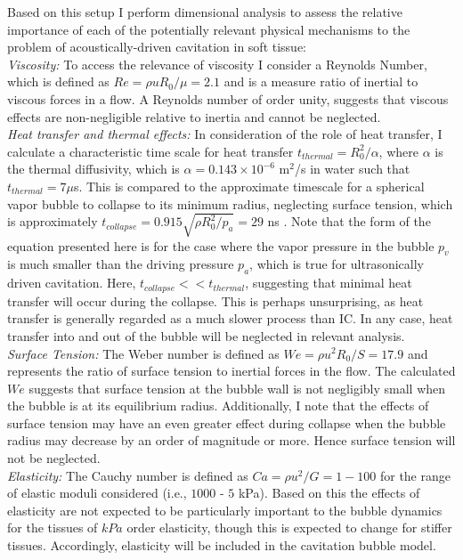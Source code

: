 Based on this setup I perform dimensional analysis to assess the
relative importance of each of the potentially relevant physical
mechanisms to the problem of acoustically-driven cavitation in soft tissue:\\

\noindent\textit{Viscosity:} To access the relevance of viscosity I consider a
Reynolds Number, which is defined as $Re = \rho u R_0/\mu=2.1$ and is
a measure ratio of inertial to viscous forces in a flow. A Reynolds
number of order unity, suggests that viscous effects
are non-negligible relative to inertia and cannot be neglected.\\

\noindent\textit{Heat transfer and thermal effects:} In consideration of the
role of heat transfer, I calculate a characteristic time scale for
heat transfer $t_{thermal}=R_0^2/\alpha$, where $\alpha$ is the
thermal diffusivity, which is $\alpha = 0.143\times10^{-6}$ m$^2$/s in
water such that $t_{thermal} = 7 \mu$s. This is compared to the
approximate timescale for a spherical vapor bubble to collapse to its
minimum radius, neglecting surface tension, which is approximately
$t_{collapse} = 0.915\sqrt{\rho R_0^2 / p_a} = 29$ ns
\citep{Brennen2003}. Note that the form of the equation presented here
is for the case where the vapor pressure in the bubble $p_v$ is much
smaller than the driving pressure $p_a$, which is true for
ultrasonically driven cavitation. Here, $t_{collapse}<<t_{thermal}$, suggesting that minimal heat transfer
will occur during the collapse. This is perhaps unsurprising, as heat
transfer is generally regarded as a much slower process than
\ac{IC}. In any case, heat transfer into and out of the bubble will be
neglected in relevant analysis.\\

\textit{Surface Tension:} The Weber number is defined as
$We = \rho u^2 R_0/S = 17.9$ and represents the ratio of surface tension
to inertial forces in the flow. The calculated $We$ suggests that
surface tension at the bubble wall is not negligibly small when the
bubble is at its equilibrium radius. Additionally, I note that the
effects of surface tension may have an even greater effect during
collapse when the bubble radius may decrease by an order of magnitude
or more. Hence surface tension will not be neglected.\\

\noindent\textit{Elasticity:} The Cauchy number is defined as
$Ca = \rho u^2 / G = 1 - 100$ for the range of elastic moduli
considered (i.e., $1000$ - $5$ kPa). Based on this the effects of elasticity are not expected
to be particularly important to the bubble dynamics for the tissues of
$kPa$ order elasticity, though this is expected to change for stiffer
tissues. Accordingly, elasticity will be included
in the cavitation bubble model.\\

